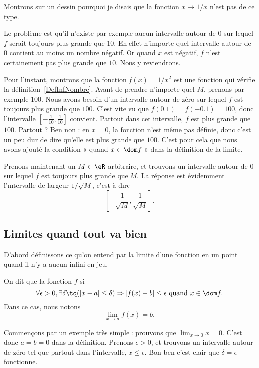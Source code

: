Montrons sur un dessin pourquoi je disais que la fonction \( x\to 1/x\) n'est pas de ce type.


Le problème est qu'il n'existe par exemple aucun intervalle autour de \( 0\) sur lequel \( f\) serait toujours plus grande que \( 10\). En effet n'importe quel intervalle autour de \( 0\) contient au moins un nombre négatif. Or quand \( x\) est négatif, \( f\) n'est certainement pas plus grande que \( 10\). Nous y reviendrons.

Pour l'instant, montrons que la fonction \( f(x)=1/x^2\) est une fonction qui vérifie la définition~\ref{DefInfNombre}.  Avant de prendre n'importe quel \( M\), prenons par exemple \( 100\). Nous avons besoin d'un intervalle autour de zéro sur lequel \( f\) est toujours plus grande que \( 100\). C'est vite vu que \( f(0.1)=f(-0.1)=100\), donc l'intervalle \( [-\frac{ 1 }{ 10 },\frac{1}{ 10 }]\) convient. Partout dans cet intervalle, \( f\) est plus grande que \( 100\). Partout ? Ben non : en \( x=0\), la fonction n'est même pas définie, donc c'est un peu dur de dire qu'elle est plus grande que \( 100\). C'est pour cela que nous avons ajouté la condition « quand \( x\in\dom f\) » dans la définition de la limite.

Prenons maintenant un \( M\in\eR\) arbitraire, et trouvons un intervalle autour de \( 0\) sur lequel \( f\) est toujours plus grande que \( M\). La réponse est évidemment l'intervalle de largeur \( 1/\sqrt{M}\), c'est-à-dire
\[
	\left[ -\frac{ 1 }{ \sqrt{M} },\frac{ 1 }{ \sqrt{M} } \right].
\]

\subsection{Limites quand tout va bien}

D'abord définissons ce qu'on entend par la limite d'une fonction en un point quand il n'y a aucun infini en jeu.
\begin{definition}      \label{DefLimPointSansInfini}
	On dit que la fonction \( f\)  si
	\[
		\forall \epsilon>0,\exists\delta\tq (| x-a |\leq\delta)\Rightarrow | f(x)-b |\leq \epsilon\text{ quand }x\in\dom f.
	\]
	Dans ce cas, nous notons
	\begin{equation}
		\lim_{x\to a}f(x)=b.
	\end{equation}
\end{definition}

Commençons par un exemple très simple : prouvons que \( \lim_{x\to 0}x=0\). C'est donc \( a=b=0\) dans la définition. Prenons \( \epsilon>0\), et trouvons un intervalle autour de zéro tel que partout dans l'intervalle, \( x\leq \epsilon\). Bon ben c'est clair que \( \delta=\epsilon\) fonctionne.

